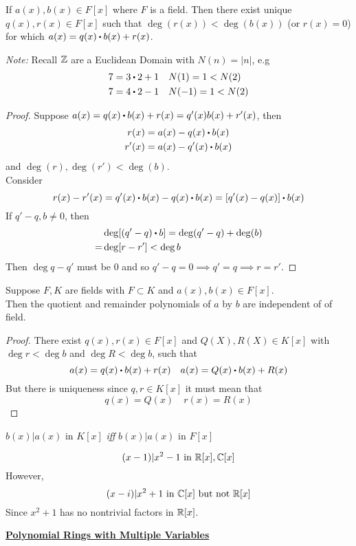 \documentclass[../Main.tex]{subfiles}
\begin{document}
\begin{thm}
	If $a(x),b(x)\in F[x]$ where $F$ is a field. Then there exist unique $q(x),r(x)\in F[x]$ such that $\deg (r(x)) < \deg (b(x))$ (or $r(x)=0$) for which $a(x)=q(x)\rdot b(x)+r(x)$.
\end{thm}
\textit{Note:} Recall $\mathbb{Z}$ are a Euclidean Domain with $N(n)=|n|$, e.g
\begin{align*}
7=3\rdot 2+1&\quad N(1)=1<N(2)\\
7=4\rdot 2-1&\quad N(-1)=1<N(2)
\end{align*}
\begin{proof}
	Suppose $a(x)=q(x)\rdot b(x)+r(x)=q'(x)b(x)+r'(x)$, then
	\begin{align*}
	r(x)&=a(x)-q(x)\rdot b(x)\\
	r'(x)&=a(x)-q'(x)\rdot b(x)
	\end{align*}
	and $\deg(r),\deg(r')<\deg(b)$.\\
	Consider
	\[r(x)-r'(x)=q'(x)\rdot b(x)-q(x)\rdot b(x) = [q'(x)-q(x)]\rdot b(x)\]
	If $q'-q,b\ne 0$, then 
	\begin{align*}
	&\deg[(q'-q)\rdot b]=\deg(q'-q)+\deg(b)\\
	=&\deg[r-r']<\deg b
	\end{align*}
	Then $\deg{q-q'}$ must be $0$ and so $q'-q=0\implies q'=q\implies r=r'$.
\end{proof}
\begin{crl}
	Suppose $F,K$ are fields with $F\subset K$ and $a(x),b(x)\in F[x]$. \\
	Then the quotient and remainder polynomials of $a$ by $b$ are independent of of field.
\end{crl}
\begin{proof}
	There exist $q(x),r(x)\in F[x]$ and $Q(X), R(X)\in K[x]$ with $\deg r< \deg b$ and $\deg R< \deg b$, such that
	\[a(x)=q(x)\rdot b(x)+r(x)\quad a(x)=Q(x)\rdot b(x)+R(x)\]
	But there is uniqueness since $q,r\in K[x]$ it must mean that
	\[q(x)=Q(x)\quad r(x)=R(x)\]
\end{proof}
\begin{crl}
	$b(x)|a(x)$ in $K[x]$ \textit{iff} $b(x)|a(x)$ in $F[x]$
\end{crl}
\begin{example}
	\[(x-1)|x^2-1 \text{ in } \mathbb{R}[x],\mathbb{C}[x]\]
	However,
	\[(x-i)| x^2+1 \text{ in } \mathbb{C}[x] \text{ but not } \mathbb{R}[x]\]
	Since $x^2+1$ has no nontrivial factors in $\mathbb{R}[x]$.
\end{example}
\newpage
\underline{\textbf{\Large Polynomial Rings with Multiple Variables}}
\end{document}
